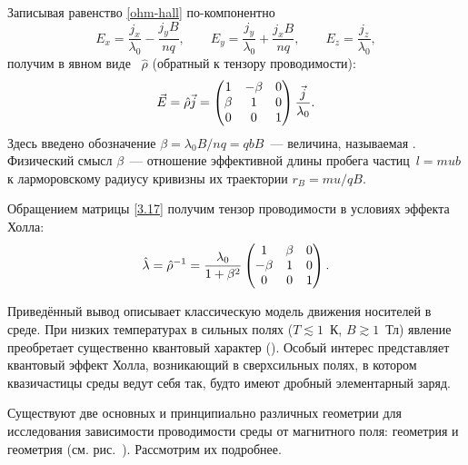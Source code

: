 Записывая равенство \eqref{ohm-hall} по-компонентно
\[
E_x = \frac{j_x}{\lambda_0}  -  \frac{j_y B}{nq} ,\qquad
    E_y = \frac{j_y}{\lambda_0} +  \frac{j_xB}{nq} ,\qquad
    E_z = \frac{j_z}{\lambda_0},
\]
получим в явном виде
~$\hat{\rho}$ (обратный к тензору
проводимости):
\begin{equation}
    \vec{E}=\hat{\rho}\vec{j}= \left(
    \begin{matrix}
        1 & -\beta & {0} \\
        \beta & 1 & {0} \\
        {0} &{0}& 1
    \end{matrix}
    \right)
    \frac{\vec{j}}{\lambda_0}.
    \eqmark{3.17}
\end{equation}
Здесь введено обозначение $\beta = \lambda_0 B/nq = q b B$~---
величина, называемая . Физический
смысл $\beta$~--- отношение эффективной длины пробега частиц~$l=mub$
к ларморовскому радиусу кривизны их траектории $r_B=mu/qB$.

Обращением матрицы \eqref{3.17} получим тензор проводимости
в условиях эффекта Холла:
\begin{equation}
    \hat{\lambda} = \hat{\rho}^{-1}=
    \frac{\lambda_0}{1+\beta^2}\left(
    \begin{matrix}
        {1} & \beta & {0} \\
        -\beta & 1 & {0} \\
        {0} &{0}& 1 \\
    \end{matrix}
    \right).
    \eqmark{3.18}
\end{equation}


\begin{lab:note}
Приведённый вывод описывает классическую модель движения носителей
в среде. При низких температурах  в сильных полях ($T\lesssim 1$~К, $B\gtrsim1$~Тл)
явление преобретает существенно квантовый характер
(). Особый интерес представляет
 квантовый эффект Холла, возникающий в сверхсильных полях,
в котором квазичастицы среды ведут себя так, будто имеют
дробный элементарный заряд.
\end{lab:note}



Существуют две основных и принципиально различных геометрии для исследования
зависимости проводимости среды от магнитного поля: геометрия  и геометрия  (см. рис.~).
Рассмотрим их подробнее.

